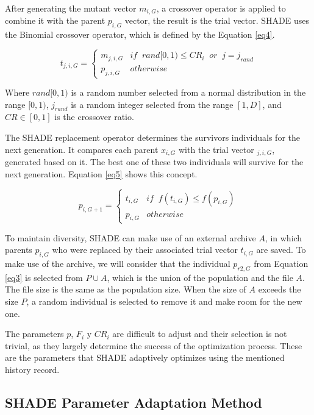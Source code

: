 \documentclass[review]{elsarticle}
\begin{document}
After generating the mutant vector $m_{i,G}$, a crossover operator is applied to combine it with the parent $p_{i,G}$ vector, the result is the trial vector. SHADE uses the Binomial crossover operator, which is defined by the Equation \eqref{eq4}.

\begin{equation}
t_{j,i,G} = \left\{ \begin{array}{lc}
m_{j,i,G} &   if \;\; rand[0,1) \le CR_i \;\; or \;\;j = j_{rand} \\
p_{j,i,G} &  otherwise
\end{array}
\right.
\label{eq4}
\end{equation}

Where $rand[0,1)$ is a random number selected from a normal distribution in the range $[0,1)$, $j_{rand}$ is a random integer selected from the range $[1,D]$, and $CR \in [0,1]$ is the crossover ratio.

The SHADE replacement operator determines the survivors individuals for the next generation. It compares each parent $x_{i,G}$ with the trial vector $_{j,i,G}$, generated based on it. The best one of these two individuals will survive for the next generation. Equation \eqref{eq5} shows this concept.

\begin{equation}
p_{i,G + 1} = \left\{ \begin{array}{lc}
t_{i,G} &   if \;\; f(t_{i,G}) \le f(p_{i,G}) \\
p_{i,G} &  otherwise
\end{array}
\right.
\label{eq5}
\end{equation}

To maintain diversity, SHADE can make use of an external archive $A$, in which parents $p_{i,G}$ who were replaced by their associated trial vector $t_{i,G}$ are saved. To make use of the archive, we will consider that the individual $p_{r2,G}$ from Equation \eqref{eq3} is selected from $P \cup A$, which is the union of the population and the file $A$. The file size is the same as the population size. When the size of $A$ exceeds the size $P$, a random individual is selected to remove it and make room for the new one.

The parameters $p$, $F_i$ y $CR_i$ are difficult to adjust and their selection is not trivial, as they largely determine the success of the optimization process. These are the parameters that SHADE adaptively optimizes using the mentioned history record.

\subsection{SHADE Parameter Adaptation Method}
\end{document}
